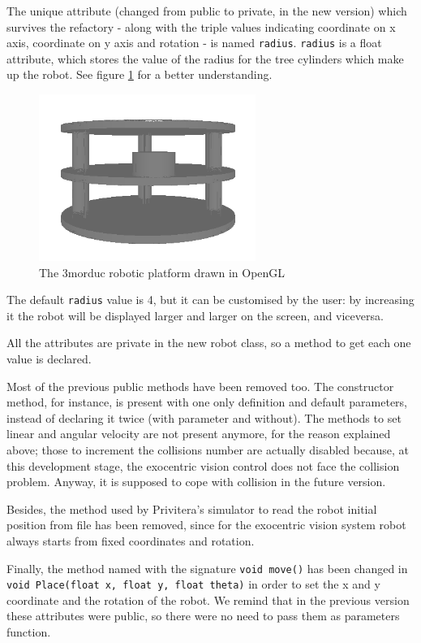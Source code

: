 %
The unique attribute (changed from public to private, in 
the new version) which survives the refactory - along with the
triple values indicating coordinate on x axis, coordinate on 
y axis and rotation - is named \texttt{radius}. \texttt{radius}
is a float attribute, which stores the value of the radius for the 
tree cylinders which make up the robot. See figure
\ref{fig:3morduc_opengl} for a better understanding.
%
\begin{figure}[!h]
  \begin{center}
    \includegraphics[width=200pt]{img/3morduc_opengl.png}  %
    \caption{The 3morduc robotic platform drawn in OpenGL}
    \label{fig:3morduc_opengl}
  \end{center}
\end{figure}
%
The default \texttt{radius} value is 4, but it can be 
customised by the user: by increasing it the robot will be 
displayed larger and larger on the screen, and viceversa.
%

%
All the attributes are private in the new robot class, 
so a method to get each one value is declared. 
%

%
Most of the previous public methods have been removed too. 
The constructor method, for instance, is present with one
only definition and default parameters, instead of declaring 
it twice (with parameter and without). The methods to set
linear and angular velocity are not present anymore, for 
the reason explained above; those to increment the collisions 
number are actually disabled because, at this development 
stage, the exocentric vision control does not face the collision 
problem. Anyway, it is supposed to cope with collision in 
the future version.
%

%
Besides, the method used by Privitera's simulator to read 
the robot initial position from file has been removed, since 
for the exocentric vision system robot always starts from 
fixed coordinates and rotation.
%

%
Finally, the method named with the signature 
\texttt{void move()} has been changed in \texttt{void Place(float x, float y, float theta)}
in order to set the x and y coordinate and the rotation of the robot. 
We remind that in the previous version these attributes
were public, so there were no need to pass them as parameters function.

